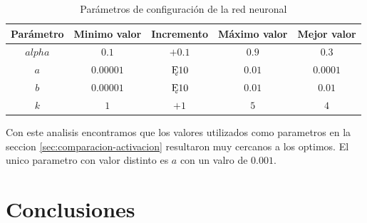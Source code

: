 \documentclass[a4paper,10pt]{article}
\begin{document}
        \begin{table}
            \begin{tabular}{|c|c|c|c|c|}
                \hline
                Parámetro & Minimo valor & Incremento & Máximo valor & Mejor valor \\ \hline
                $alpha$ & $0.1$ & $+ 0.1$ & $0.9$ & $0.3$ \\ \hline
                $a$ & $0.00001$ & $\Cross 10$ & $0.01$ & $0.0001$ \\ \hline
                $b$ & $0.00001$ & $\Cross 10$ & $0.01$ & $0.01$ \\ \hline
                $k$ & $1$ & $+ 1$ & $5$ & $4$ \\ \hline
            \end{tabular}
            \caption{Parámetros de configuración de la red neuronal}
            \label{tabla_configuracion}
        \end{table}

        Con este analisis encontramos que los valores utilizados como parametros en la seccion \ref{sec:comparacion-activacion} resultaron muy cercanos a los optimos.
        El unico parametro con valor distinto es $a$ con un valro de $0.001$.


\section{Conclusiones}




\end{document}
